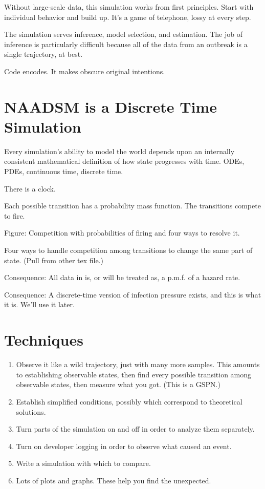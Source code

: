 \documentclass{article}
\begin{document}
Without large-scale data, this simulation works from first principles.
Start with individual behavior and build up.
It's a game of telephone, lossy at every step.

The simulation serves inference, model selection,
and estimation. The job of inference is particularly difficult
because all of the data from an outbreak is a single trajectory,
at best.

Code encodes. It makes obscure original intentions.

\section{NAADSM is a Discrete Time Simulation}

Every simulation's ability to model the world depends
upon an internally consistent mathematical definition
of how state progresses with time.
ODEs, PDEs, continuous time, discrete time.

There is a clock.

Each possible transition has a probability mass function.
The transitions compete to fire.

Figure: Competition with probabilities of firing and four
ways to resolve it.

Four ways to handle competition among transitions to
change the same part of state. (Pull from other tex file.)

Consequence: All data in is, or will be treated as, a p.m.f.
of a hazard rate.

Consequence: A discrete-time version of infection pressure
exists, and this is what it is. We'll use it later.


\section{Techniques}
\begin{enumerate}
  \item Observe it like a wild trajectory, just with many more samples.
        This amounts to establishing observable states, then find every
        possible transition among observable states, then measure
        what you got. (This is a GSPN.)
  \item Establish simplified conditions, possibly which correspond
        to theoretical solutions.
  \item Turn parts of the simulation on and off in order to analyze them
        separately.
  \item Turn on developer logging in order to observe what caused an event.
  \item Write a simulation with which to compare.
  \item Lots of plots and graphs. These help you find the unexpected.
\end{enumerate}
\end{document}
